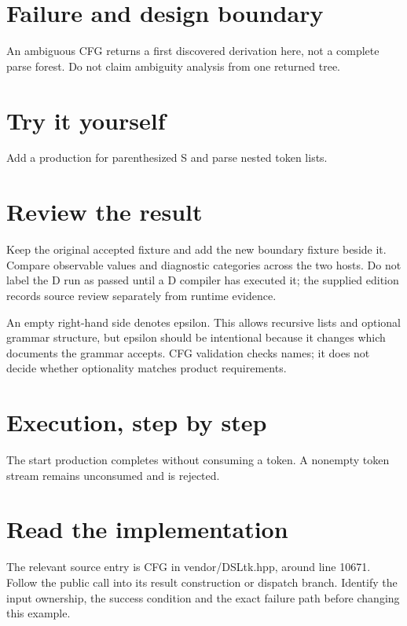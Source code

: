 
\section*{Failure and design boundary}
An ambiguous CFG returns a first discovered derivation here, not a complete parse forest. Do not claim ambiguity analysis from one returned tree.

\section*{Try it yourself}
Add a production for parenthesized S and parse nested token lists.

\section*{Review the result}
Keep the original accepted fixture and add the new boundary fixture beside it. Compare observable values and diagnostic categories across the two hosts. Do not label the D run as passed until a D compiler has executed it; the supplied edition records source review separately from runtime evidence.

\clearpage
{}
An empty right-hand side denotes epsilon. This allows recursive lists and optional grammar structure, but epsilon should be intentional because it changes which documents the grammar accepts. CFG validation checks names; it does not decide whether optionality matches product requirements.


\section*{Execution, step by step}
The start production completes without consuming a token. A nonempty token stream remains unconsumed and is rejected.

\section*{Read the implementation}
The relevant source entry is CFG in vendor/DSLtk.hpp, around line 10671. Follow the public call into its result construction or dispatch branch. Identify the input ownership, the success condition and the exact failure path before changing this example.

